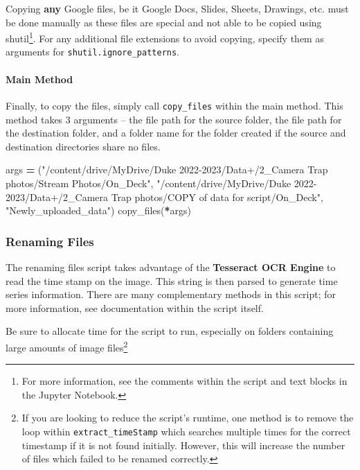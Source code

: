 \documentclass[
]{article}
\newenvironment{Shaded}{\begin{snugshade}}{\end{snugshade}}
\newcommand{\NormalTok}[1]{#1}
\newcommand{\OperatorTok}[1]{\textcolor[rgb]{0.81,0.36,0.00}{\textbf{#1}}}
\newcommand{\StringTok}[1]{\textcolor[rgb]{0.31,0.60,0.02}{#1}}
\begin{document}
Copying \textbf{any} Google files, be it Google Docs, Slides, Sheets, Drawings, etc. must be done manually as these files are special and not able to be copied using shutil\footnote{For more information, see the comments within the script and text blocks in the Jupyter Notebook.}. For any additional file extensions to avoid copying, specify them as arguments for \texttt{shutil.ignore\_patterns}.

\hypertarget{main-method}{%
\paragraph{Main Method}\label{main-method}}

Finally, to copy the files, simply call \texttt{copy\_files} within the main method. This method takes 3 arguments -- the file path for the source folder, the file path for the destination folder, and a folder name for the folder created if the source and destination directories share no files.

\begin{Shaded}
\begin{Highlighting}[]
\NormalTok{args }\OperatorTok{=}\NormalTok{ (}\StringTok{"/content/drive/MyDrive/Duke 2022{-}2023/Data+/2\_Camera Trap photos/Stream Photos/On\_Deck"}\NormalTok{, }\StringTok{"/content/drive/MyDrive/Duke 2022{-}2023/Data+/2\_Camera Trap photos/COPY of data for script/On\_Deck"}\NormalTok{, }\StringTok{"Newly\_uploaded\_data"}\NormalTok{)}
\NormalTok{copy\_files(}\OperatorTok{*}\NormalTok{args)}
\end{Highlighting}
\end{Shaded}

\hypertarget{renaming-files}{%
\subsubsection{Renaming Files}\label{renaming-files}}

The renaming files script takes advantage of the \textbf{Tesseract OCR Engine} to read
the time stamp on the image. This string is then parsed to generate time series information. There are many complementary methods in this script; for more information, see documentation within the script itself.

Be sure to allocate time for the script to run, especially on folders containing
large amounts of image files\footnote{If you are looking to reduce the script's runtime, one method is to remove the loop within \texttt{extract\_timeStamp} which searches multiple times for the correct timestamp if it is not found initially. However, this will increase the number of files which failed to be renamed correctly.}
\end{document}
